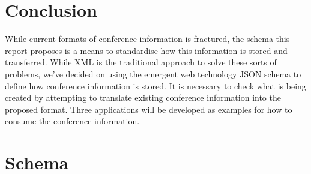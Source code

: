 \documentclass{article}
\begin{document}
\section{Conclusion}
While current formats of conference information is fractured, the schema this report proposes is a means to standardise how this information is stored and transferred. While XML is the traditional approach to solve these sorts of problems, we've decided on using the emergent web technology JSON schema to define how conference information is stored. It is necessary to check what is being created by attempting to translate existing conference information into the proposed format. Three applications will be developed as examples for how to consume the conference information.




\onecolumn
\appendix
\section{Schema}
% 

\end{document}
